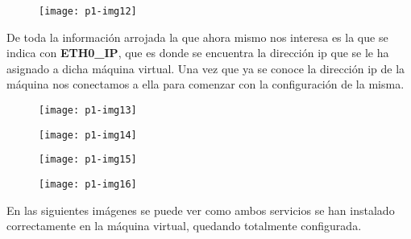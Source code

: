 \documentclass[10pt]{article}
\begin{document}
\begin{figure}[H]
	\begin{center}
 		\texttt{[image: p1-img12]}
	\end{center} 
\end{figure}


De toda la información arrojada la que ahora mismo nos interesa es la que se indica con \textbf{ETH0\_IP}, que es donde se encuentra la dirección ip que se le ha asignado a dicha máquina virtual. Una vez que ya se conoce la dirección ip de la máquina nos conectamos a ella para comenzar con la configuración de la misma.\\

\begin{figure}[H]
	\begin{center}
 		\texttt{[image: p1-img13]}
	\end{center} 
\end{figure}

\begin{figure}[H]
	\begin{center}
 		\texttt{[image: p1-img14]}
	\end{center} 
\end{figure}

\begin{figure}[H]
	\begin{center}
 		\texttt{[image: p1-img15]}
	\end{center} 
\end{figure}

\begin{figure}[H]
	\begin{center}
 		\texttt{[image: p1-img16]}
	\end{center} 
\end{figure}

En las siguientes imágenes se puede ver como ambos servicios se han instalado correctamente en la máquina virtual, quedando totalmente configurada. \\
\end{document}
